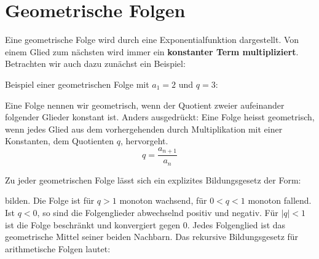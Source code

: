 \section{Geometrische Folgen}
Eine geometrische Folge wird durch eine Exponentialfunktion dargestellt. Von einem Glied zum nächsten wird immer ein \textbf{konstanter Term multipliziert}. Betrachten wir auch dazu zunächst ein Beispiel:
\begin{example}
Beispiel einer geometrischen Folge mit $a_{1}=2$ und $q=3$:
\begin{gelb}
\vspace{1.5cm}
\end{gelb}
\end{example}

\begin{definition}
Eine Folge nennen wir geometrisch, wenn der Quotient zweier aufeinander folgender Glieder konstant ist. Anders ausgedrückt: Eine Folge heisst geometrisch, wenn jedes Glied aus dem vorhergehenden durch Multiplikation mit einer Konstanten, dem Quotienten $q$, hervorgeht.
\[ q = \frac{a_{n+1}}{a_{n}} \]
\end{definition}

Zu jeder geometrischen Folge lässt sich ein explizites Bildungsgesetz der Form:
\begin{gelb}
\vspace{2cm}
\end{gelb}
bilden. Die Folge ist für $q>1$ monoton wachsend, für $0<q<1$ monoton fallend. Ist $q<0$, so sind die Folgenglieder abwechselnd positiv und negativ. Für $|q|<1$ ist die Folge beschränkt und konvergiert gegen 0. Jedes Folgenglied ist das geometrische Mittel seiner beiden Nachbarn. Das rekursive Bildungsgesetz für arithmetische Folgen lautet:
\begin{gelb}
\vspace{2cm}
\end{gelb}






